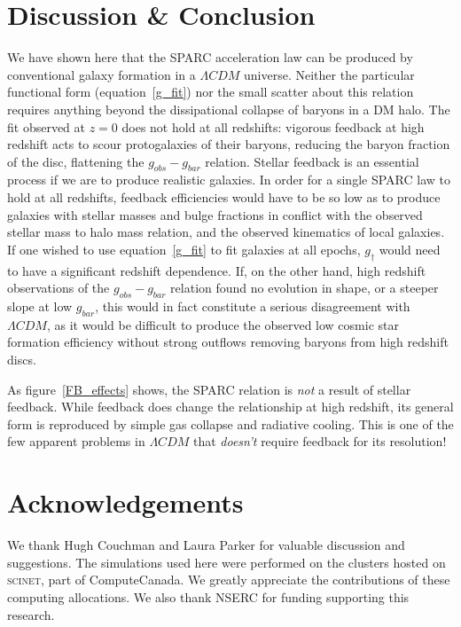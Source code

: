 \section{Discussion \& Conclusion}
We have shown here that the SPARC acceleration law can be produced by conventional
galaxy formation in a $\Lambda CDM$ universe.  Neither the particular functional
form (equation~\ref{g_fit}) nor the small scatter about this relation requires
anything beyond the dissipational collapse of baryons in a DM halo.  The fit
observed at $z=0$ does not hold at all redshifts: vigorous feedback at high
redshift acts to scour protogalaxies of their baryons, reducing the baryon
fraction of the disc, flattening the $g_{obs}-g_{bar}$ relation.  Stellar
feedback is an essential process if we are to produce realistic galaxies.  In order for
a single SPARC law to hold at all redshifts, feedback efficiencies would have to
be so low as to produce galaxies with stellar masses and bulge fractions in
conflict with the observed stellar mass to halo mass relation, and the observed
kinematics of local galaxies. If one wished to use equation~\ref{g_fit} to fit
galaxies at all epochs, $g_\dagger$ would need to have a significant redshift
dependence.  If, on the other hand, high redshift observations of the
$g_{obs}-g_{bar}$ relation found no evolution in shape, or a steeper slope at
low $g_{bar}$, this would in fact constitute a serious disagreement with
$\Lambda CDM$, as it would be difficult to produce the observed low cosmic star
formation efficiency without strong outflows removing baryons from high redshift
discs.

As figure~\ref{FB_effects} shows, the SPARC relation is {\it not} a result of
stellar feedback.  While feedback does change the relationship at high redshift,
its general form is reproduced by simple gas collapse and radiative cooling.
This is one of the few apparent problems in $\Lambda CDM$ that {\it doesn't}
require feedback for its resolution!

\section*{Acknowledgements}
We thank Hugh Couchman and Laura Parker for valuable discussion and suggestions.
The simulations used here were performed on the clusters hosted on
\textsc{scinet}, part of ComputeCanada.  We greatly appreciate the contributions
of these computing allocations.  We also thank NSERC for funding supporting this
research.  



